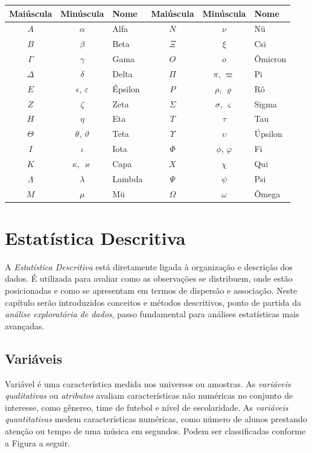 \documentclass[
]{book}
\theoremstyle{definition}
\theoremstyle{definition}
\theoremstyle{definition}
\theoremstyle{remark}
\begin{document}
\begin{longtable}[]{@{}cclccl@{}}
\toprule
Maiúscula & Minúscula & Nome & Maiúscula & Minúscula & Nome\tabularnewline
\midrule
\endhead
\(A\) & \(\alpha\) & Alfa & \(N\) & \(\nu\) & Nü\tabularnewline
\(B\) & \(\beta\) & Beta & \(\Xi\) & \(\xi\) & Csi\tabularnewline
\(\Gamma\) & \(\gamma\) & Gama & \(O\) & \(o\) & Ômicron\tabularnewline
\(\Delta\) & \(\delta\) & Delta & \(\Pi\) & \(\pi\), \(\varpi\) & Pi\tabularnewline
\(E\) & \(\epsilon\), \(\varepsilon\) & Épsilon & \(P\) & \(\rho\), \(\varrho\) & Rô\tabularnewline
\(Z\) & \(\zeta\) & Zeta & \(\Sigma\) & \(\sigma\), \(\varsigma\) & Sigma\tabularnewline
\(H\) & \(\eta\) & Eta & \(T\) & \(\tau\) & Tau\tabularnewline
\(\Theta\) & \(\theta\), \(\vartheta\) & Teta & \(\Upsilon\) & \(\upsilon\) & Úpsilon\tabularnewline
\(I\) & \(\iota\) & Iota & \(\Phi\) & \(\phi\), \(\varphi\) & Fi\tabularnewline
\(K\) & \(\kappa\), \(\varkappa\) & Capa & \(X\) & \(\chi\) & Qui\tabularnewline
\(\Lambda\) & \(\lambda\) & Lambda & \(\Psi\) & \(\psi\) & Psi\tabularnewline
\(M\) & \(\mu\) & Mü & \(\Omega\) & \(\omega\) & Ômega\tabularnewline
\bottomrule
\end{longtable}

\hypertarget{estatistica-descritiva}{%
\chapter{Estatística Descritiva}\label{estatistica-descritiva}}

A \emph{Estatística Descritiva} está diretamente ligada à organização e descrição dos dados. É utilizada para avaliar como as observações se distribuem, onde estão posicionadas e como se apresentam em termos de dispersão e associação. Neste capítulo serão introduzidos conceitos e métodos descritivos, ponto de partida da \emph{análise exploratória de dados}, passo fundamental para análises estatísticas mais avançadas.

\hypertarget{variuxe1veis}{%
\section{Variáveis}\label{variuxe1veis}}

Variável é uma característica medida nos universos ou amostras. As \emph{variáveis qualitativas} ou \emph{atributos} avaliam características não numéricas no conjunto de interesse, como gênereo, time de futebol e nível de escolaridade. As \emph{variáveis quantitativas} medem características numéricas, como número de alunos prestando atenção ou tempo de uma música em segundos. Podem ser classificadas conforme a Figura a seguir.
\end{document}
